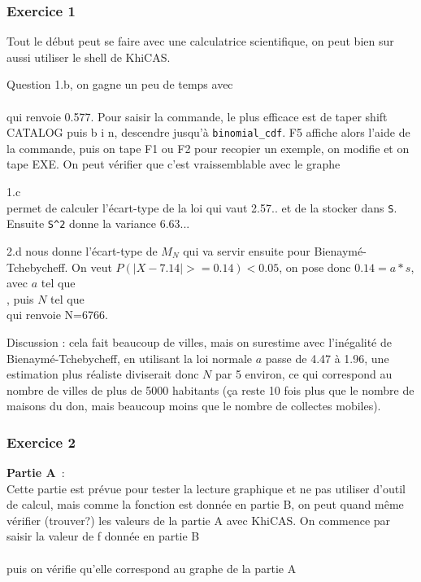 \documentclass{article}
\begin{document}
\begin{giacjshere}
\subsubsection{Exercice 1}
Tout le début peut se faire avec une calculatrice scientifique, 
on peut bien sur aussi utiliser le shell de KhiCAS.

Question 1.b, on gagne un peu de temps avec\\
\\
qui renvoie 0.577. Pour saisir la commande, le plus efficace est
de taper shift CATALOG puis b i n, descendre jusqu'à 
\verb|binomial_cdf|. F5 affiche alors l'aide de la commande, puis
on tape F1 ou F2 pour recopier un exemple, on modifie et on tape EXE.
On peut vérifier que c'est vraissemblable avec le graphe\\

1.c
\\
permet de calculer l'écart-type de la loi qui vaut 2.57.. et
de la stocker dans {\tt S}.
Ensuite \verb|S^2| donne la variance 6.63...

2.d
nous donne l'écart-type de $M_N$ qui 
va servir ensuite pour Bienaymé-Tchebycheff. 
On veut $P(|X-7.14|>=0.14)<0.05$, on pose donc $0.14=a*s$, 
avec $a$ tel que \\
, 
puis $N$ tel que \\
 qui renvoie N=6766.

Discussion : cela fait beaucoup de villes, mais on surestime avec l'inégalité de Bienaymé-Tchebycheff, en utilisant la loi normale $a$ passe de 4.47 à 1.96, 
une estimation plus réaliste diviserait donc $N$ par 5 environ, 
ce qui correspond au nombre de villes de plus de 5000 habitants 
(ça reste 10 fois plus que le nombre de maisons du don, mais beaucoup 
moins que le nombre de collectes mobiles). 

\subsubsection{Exercice 2}
{\bf Partie A}~:\\
Cette partie est prévue pour tester la lecture graphique 
et ne pas utiliser d'outil de calcul,
mais comme la fonction est donnée en partie B, on peut quand même 
vérifier (trouver?) les valeurs de la partie A avec KhiCAS.
On commence par saisir la valeur de f donnée en partie B\\
\\
puis on vérifie qu'elle correspond au graphe de la partie A\\


\end{giacjshere}
\end{document}

